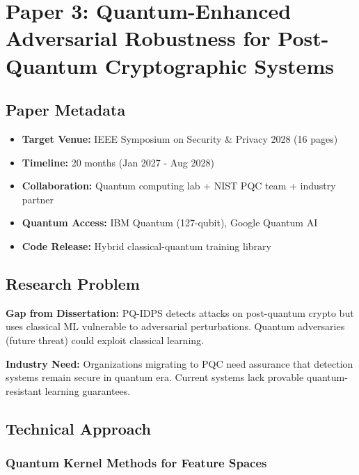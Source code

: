 \documentclass[11pt,letterpaper]{article}
\begin{document}
\newpage

\section{Paper 3: Quantum-Enhanced Adversarial Robustness for Post-Quantum Cryptographic Systems}

\subsection{Paper Metadata}

\begin{itemize}[leftmargin=2em]
\item \textbf{Target Venue:} IEEE Symposium on Security \& Privacy 2028 (16 pages)
\item \textbf{Timeline:} 20 months (Jan 2027 - Aug 2028)
\item \textbf{Collaboration:} Quantum computing lab + NIST PQC team + industry partner
\item \textbf{Quantum Access:} IBM Quantum (127-qubit), Google Quantum AI
\item \textbf{Code Release:} Hybrid classical-quantum training library
\end{itemize}

\subsection{Research Problem}

\textbf{Gap from Dissertation:} PQ-IDPS detects attacks on post-quantum crypto but uses classical ML vulnerable to adversarial perturbations. Quantum adversaries (future threat) could exploit classical learning.

\textbf{Industry Need:} Organizations migrating to PQC need assurance that detection systems remain secure in quantum era. Current systems lack provable quantum-resistant learning guarantees.

\subsection{Technical Approach}

\subsubsection{Quantum Kernel Methods for Feature Spaces}
\end{document}
